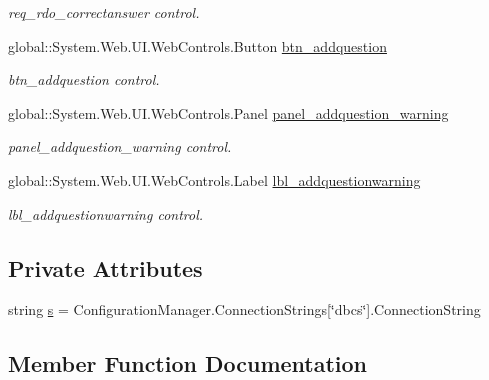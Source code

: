 \begin{DoxyCompactItemize}
\begin{DoxyCompactList}\small\item\em req\+\_\+rdo\+\_\+correctanswer control. \end{DoxyCompactList}\item 
global\+::\+System.\+Web.\+U\+I.\+Web\+Controls.\+Button \mbox{\hyperlink{class_admin__addquestion_ab3d0580e5cafa60731a14bb68962dfc9}{btn\+\_\+addquestion}}
\begin{DoxyCompactList}\small\item\em btn\+\_\+addquestion control. \end{DoxyCompactList}\item 
global\+::\+System.\+Web.\+U\+I.\+Web\+Controls.\+Panel \mbox{\hyperlink{class_admin__addquestion_a22416d110dda5270298d890ee3d076b9}{panel\+\_\+addquestion\+\_\+warning}}
\begin{DoxyCompactList}\small\item\em panel\+\_\+addquestion\+\_\+warning control. \end{DoxyCompactList}\item 
global\+::\+System.\+Web.\+U\+I.\+Web\+Controls.\+Label \mbox{\hyperlink{class_admin__addquestion_aef99774530024c9b88b1dd2f71b4269a}{lbl\+\_\+addquestionwarning}}
\begin{DoxyCompactList}\small\item\em lbl\+\_\+addquestionwarning control. \end{DoxyCompactList}\end{DoxyCompactItemize}
\subsection*{Private Attributes}
\begin{DoxyCompactItemize}
\item 
string \mbox{\hyperlink{class_admin__addquestion_acf6eac590324e3f04ae082f75d7e6f08}{s}} = Configuration\+Manager.\+Connection\+Strings\mbox{[}\char`\"{}dbcs\char`\"{}\mbox{]}.Connection\+String
\end{DoxyCompactItemize}


\subsection{Member Function Documentation}
\mbox{\label{class_admin__addquestion_a814cc6db038926692c3cecdcff856b72}} 
